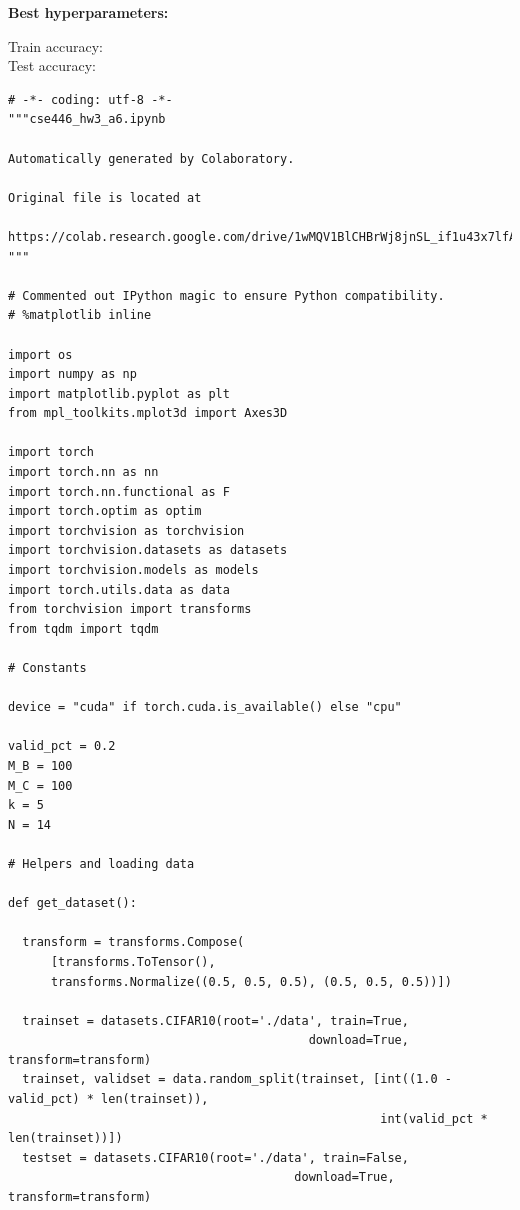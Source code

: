 \documentclass{article}
\newcommand{\1}{\mathbf{1}}
\begin{document}
{\begin{figure}[h]
  \centering
\end{figure}

\textbf{Best hyperparameters:}

\begin{figure}[h]
  \centering
\end{figure}

Train accuracy: \\
Test accuracy: 

\newpage

\begin{verbatim}
# -*- coding: utf-8 -*-
"""cse446_hw3_a6.ipynb

Automatically generated by Colaboratory.

Original file is located at
    https://colab.research.google.com/drive/1wMQV1BlCHBrWj8jnSL_if1u43x7lfAIO
"""

# Commented out IPython magic to ensure Python compatibility.
# %matplotlib inline

import os
import numpy as np
import matplotlib.pyplot as plt
from mpl_toolkits.mplot3d import Axes3D

import torch
import torch.nn as nn
import torch.nn.functional as F
import torch.optim as optim
import torchvision as torchvision
import torchvision.datasets as datasets
import torchvision.models as models
import torch.utils.data as data
from torchvision import transforms
from tqdm import tqdm

# Constants 

device = "cuda" if torch.cuda.is_available() else "cpu"

valid_pct = 0.2
M_B = 100
M_C = 100
k = 5
N = 14

# Helpers and loading data

def get_dataset():

  transform = transforms.Compose(
      [transforms.ToTensor(),
      transforms.Normalize((0.5, 0.5, 0.5), (0.5, 0.5, 0.5))])

  trainset = datasets.CIFAR10(root='./data', train=True,
                                          download=True, transform=transform)
  trainset, validset = data.random_split(trainset, [int((1.0 - valid_pct) * len(trainset)),
                                                    int(valid_pct * len(trainset))])
  testset = datasets.CIFAR10(root='./data', train=False,
                                        download=True, transform=transform)


\end{verbatim}}
\end{document}
